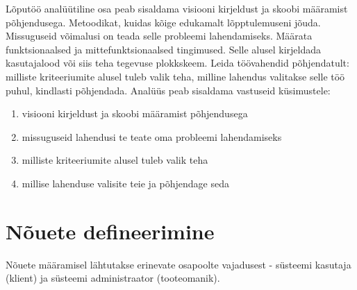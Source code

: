 Lõputöö analüütiline osa peab sisaldama visiooni kirjeldust ja skoobi
määramist põhjendusega. Metoodikat, kuidas kõige edukamalt lõpptulemuseni
jõuda. Missuguseid võimalusi on teada selle probleemi lahendamiseks. Määrata
funktsionaalsed ja mittefunktsionaalsed tingimused. Selle alusel kirjeldada
kasutajalood või siis teha tegevuse plokkskeem. Leida töövahendid
põhjendatult: milliste kriteeriumite alusel tuleb valik teha, milline lahendus
valitakse selle töö puhul, kindlasti põhjendada.
Analüüs peab sisaldama vastuseid küsimustele:
\begin{enumerate}
    \item visiooni kirjeldust ja skoobi määramist põhjendusega
    \item missuguseid lahendusi te teate oma probleemi lahendamiseks
    \item milliste kriteeriumite alusel tuleb valik teha
    \item millise lahenduse valisite teie ja põhjendage seda
\end{enumerate}



\section{Nõuete defineerimine}
Nõuete määramisel lähtutakse erinevate osapoolte vajadusest - süsteemi kasutaja (klient) ja süsteemi administraator (tooteomanik).


